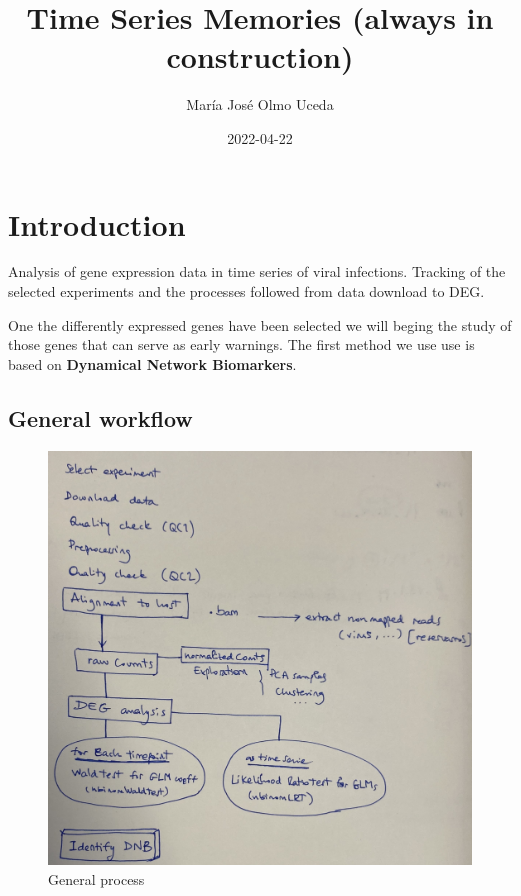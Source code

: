 \documentclass[
]{book}
\title{Time Series Memories (always in construction)}
\author{María José Olmo Uceda}
\date{2022-04-22}
\begin{document}
\maketitle

{
\setcounter{tocdepth}{1}
\tableofcontents
}
\hypertarget{introduction}{%
\chapter{Introduction}\label{introduction}}

Analysis of gene expression data in time series of viral infections. Tracking of the selected experiments and the processes followed from data download to DEG.

One the differently expressed genes have been selected we will beging the study of those genes that can serve as early warnings. The first method we use use is based on \textbf{Dynamical Network Biomarkers}.

\hypertarget{general-workflow}{%
\section{General workflow}\label{general-workflow}}

\begin{figure}
\centering
\includegraphics{images/general_workflow.jpg}
\caption{General process}
\end{figure}
\end{document}
